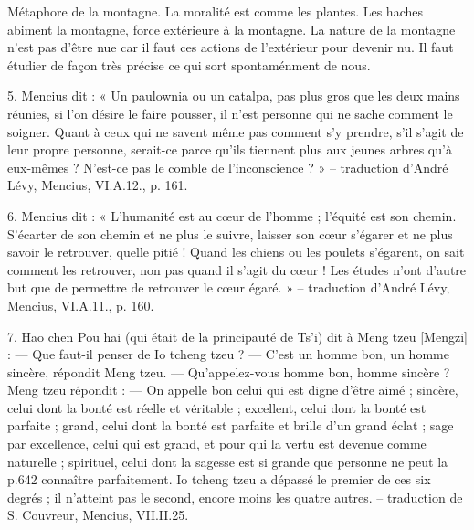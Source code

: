 Métaphore de la montagne. La moralité est comme les plantes. Les haches abiment la montagne, force extérieure à la montagne. La nature de la montagne n'est pas d'être nue car il faut ces actions de l'extérieur pour devenir nu. Il faut étudier de façon très précise ce qui sort spontaménment de nous. 

\begin{singlequote}
    5.	Mencius dit : « Un paulownia ou un catalpa, pas plus gros que les deux mains réunies, si l’on désire le faire pousser, il n’est personne qui ne sache comment le soigner. Quant à ceux qui ne savent même pas comment s’y prendre, s’il s’agit de leur propre personne, serait-ce parce qu’ils tiennent plus aux jeunes arbres qu’à eux-mêmes ? N’est-ce pas le comble de l’inconscience ? »
-- traduction d’André Lévy, Mencius, VI.A.12., p. 161.
\end{singlequote}

\begin{singlequote}
    6.	Mencius dit : « L’humanité est au cœur de l’homme ; l’équité est son chemin. S’écarter de son chemin et ne plus le suivre, laisser son cœur s’égarer et ne plus savoir le retrouver, quelle pitié ! Quand les chiens ou les poulets s’égarent, on sait comment les retrouver, non pas quand il s’agit du cœur !
Les études n’ont d’autre but que de permettre de retrouver le cœur égaré. »
-- traduction d’André Lévy, Mencius, VI.A.11., p. 160.
\end{singlequote}

\begin{singlequote}
    7.	Hao chen Pou hai (qui était de la principauté de Ts’i) dit à Meng tzeu [Mengzi] :
—	Que faut-il penser de Io tcheng tzeu ?
—	C’est un homme bon, un homme sincère, répondit Meng tzeu.
—	Qu’appelez-vous homme bon, homme sincère ? Meng tzeu répondit :
—	On appelle bon celui qui est digne d’être aimé ; sincère, celui dont la bonté est réelle et véritable ; excellent, celui dont la bonté est parfaite ; grand, celui dont la bonté est parfaite et brille d’un grand éclat ; sage par excellence, celui qui est grand, et pour qui la vertu est devenue comme naturelle ; spirituel, celui dont la sagesse est si grande que personne ne peut la p.642 connaître parfaitement. Io tcheng tzeu a dépassé le premier de ces six degrés ; il n’atteint pas le second, encore moins les quatre autres.
-- traduction de S. Couvreur, Mencius, VII.II.25.
\end{singlequote}

